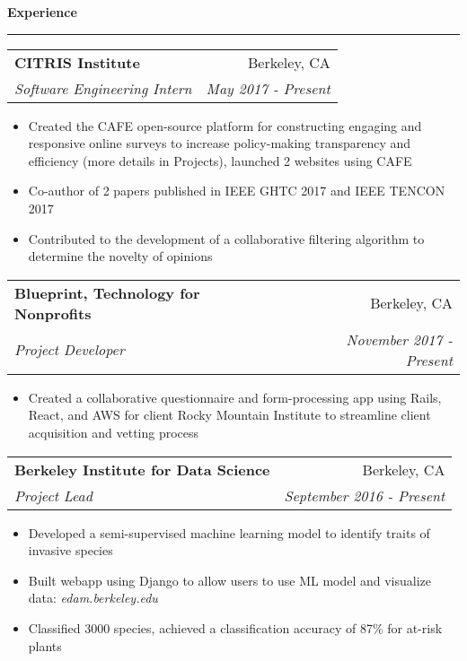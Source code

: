 \documentclass[11pt,letterpaper]{article}
\makeatletter
\newenvironment{topic}[1]
    {
    {\Large \centerline{#1}}
    \vspace*{0.03in}
    \hrule 
    \vspace*{0.05in}
    }
    {}
\newenvironment{event}
    {
    \begin{tabular*}{\textwidth}{l@{\extracolsep{\fill}}r}
    }
    {
    \end{tabular*}
    }
\makeatother
\begin{document}
    \begin{topic}{\textbf{Experience}}
        \begin{event}
            \textbf{CITRIS Institute} & Berkeley, CA \\
            \emph{Software Engineering Intern} & \emph{May 2017 - Present}
        \end{event}
            \begin{itemize}
                \item Created the CAFE open-source platform for constructing engaging and responsive online surveys to increase policy-making transparency and efficiency (more details in Projects), launched 2 websites using CAFE
                \item Co-author of 2 papers published in IEEE GHTC 2017 and IEEE TENCON 2017
                \item Contributed to the development of a collaborative filtering algorithm to determine the novelty of opinions
            \end{itemize}

        \begin{event}
            \textbf{Blueprint, Technology for Nonprofits} & Berkeley, CA \\
            \emph{Project Developer} & \emph{November 2017 - Present}
        \end{event}
            \begin{itemize}
                \item Created a collaborative questionnaire and form-processing app using Rails, React, and AWS for client Rocky Mountain Institute to streamline client acquisition and vetting process
            \end{itemize}

        \begin{event}
            \textbf{Berkeley Institute for Data Science} & Berkeley, CA \\
            \emph{Project Lead} & \emph{September 2016 - Present} \\
        \end{event}
            \begin{itemize}
                \item Developed a semi-supervised machine learning model to identify traits of invasive species
                \item Built webapp using Django to allow users to use ML model and visualize data: \emph{edam.berkeley.edu}
                \item Classified 3000 species, achieved a classification accuracy of 87\% for at-risk plants
            \end{itemize}

        
        
    \end{topic} \vspace*{0.1in}
\end{document}

